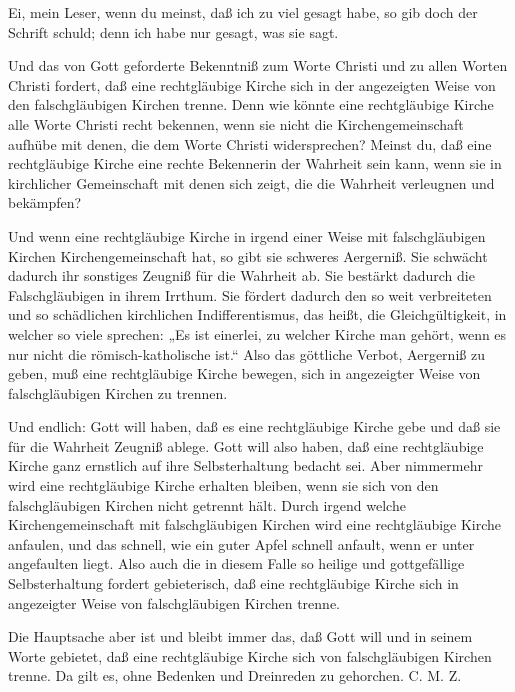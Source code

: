 Ei, mein Leser, wenn du meinst, daß ich zu viel gesagt habe, so gib doch der Schrift schuld; denn ich habe nur gesagt, was sie sagt.

Und das von Gott geforderte Bekenntniß zum Worte Christi und zu allen Worten Christi fordert, daß eine rechtgläubige Kirche sich in der angezeigten Weise von den falschgläubigen Kirchen trenne. Denn wie könnte eine rechtgläubige Kirche alle Worte Christi recht bekennen, wenn sie nicht die Kirchengemeinschaft aufhübe mit denen, die dem Worte Christi widersprechen? Meinst du, daß eine rechtgläubige Kirche eine rechte Bekennerin der Wahrheit sein kann, wenn sie in kirchlicher Gemeinschaft mit denen sich zeigt, die die Wahrheit verleugnen und bekämpfen?

Und wenn eine rechtgläubige Kirche in irgend einer Weise mit falschgläubigen Kirchen Kirchengemeinschaft hat, so gibt sie schweres Aergerniß. Sie schwächt dadurch ihr sonstiges Zeugniß für die Wahrheit ab. Sie bestärkt dadurch die Falschgläubigen in ihrem Irrthum. Sie fördert dadurch den so weit verbreiteten und so schädlichen kirchlichen Indifferentismus, das heißt, die Gleichgültigkeit, in welcher so viele sprechen: „Es ist einerlei, zu welcher Kirche man gehört, wenn es nur nicht die römisch-katholische ist.“ Also das göttliche Verbot, Aergerniß zu geben, muß eine rechtgläubige Kirche bewegen, sich in angezeigter Weise von falschgläubigen Kirchen zu trennen.

Und endlich: Gott will haben, daß es eine rechtgläubige Kirche gebe und daß sie für die Wahrheit Zeugniß ablege. Gott will also haben, daß eine rechtgläubige Kirche ganz ernstlich auf ihre Selbsterhaltung bedacht sei. Aber nimmermehr wird eine rechtgläubige Kirche erhalten bleiben, wenn sie sich von den falschgläubigen Kirchen nicht getrennt hält. Durch irgend welche Kirchengemeinschaft mit falschgläubigen Kirchen wird eine rechtgläubige Kirche anfaulen, und das schnell, wie ein guter Apfel schnell anfault, wenn er unter angefaulten liegt. Also auch die in diesem Falle so heilige und gottgefällige Selbsterhaltung fordert gebieterisch, daß eine rechtgläubige Kirche sich in angezeigter Weise von falschgläubigen Kirchen trenne.

Die Hauptsache aber ist und bleibt immer das, daß Gott will und in seinem Worte gebietet, daß eine rechtgläubige Kirche sich von falschgläubigen Kirchen trenne. Da gilt es, ohne Bedenken und Dreinreden zu gehorchen. C. M. Z.

